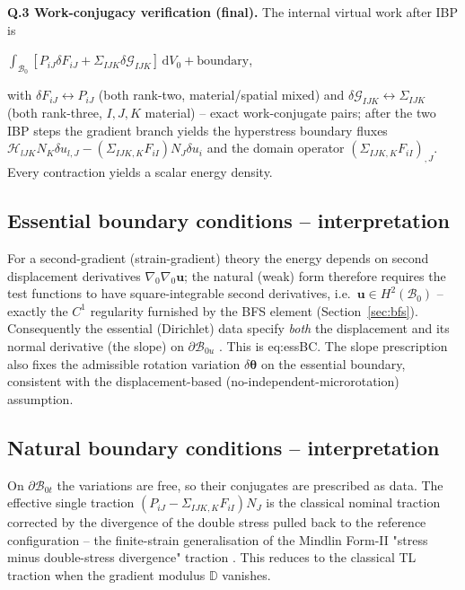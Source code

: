 \documentclass[11pt]{article}
\begin{document}
\textbf{Q.3 Work-conjugacy verification (final).} The internal virtual work after IBP is

$\int_{\mathcal{B}_0}[P_{iJ}\delta F_{iJ}+\Sigma_{IJK}\delta\mathcal{G}_{IJK}]\,\mathrm{d}V_0+\text{boundary}$,

with $\delta F_{iJ}\leftrightarrow P_{iJ}$ (both rank-two, material/spatial mixed) and $\delta\mathcal{G}_{IJK}\leftrightarrow\Sigma_{IJK}$ (both rank-three, $I,J,K$ material) -- exact work-conjugate pairs; after the two IBP steps the gradient branch yields the hyperstress boundary fluxes $\mathcal{H}_{lJK}N_K\delta u_{l,J}-(\Sigma_{IJK,K}F_{iI})N_J\delta u_i$ and the domain operator $(\Sigma_{IJK,K}F_{iI})_{,J}$. Every contraction yields a scalar energy density. \checkmark

\subsection{Essential boundary conditions -- interpretation}
\label{subsec:essentialnotes}

For a second-gradient (strain-gradient) theory the energy depends on second displacement derivatives $\nabla_0\nabla_0\mathbf{u}$; the natural (weak) form therefore requires the test functions to have square-integrable second derivatives, i.e.\ $\mathbf{u}\in H^2(\mathcal{B}_0)$ -- exactly the $C^1$ regularity furnished by the BFS element (Section~\ref{sec:bfs}). Consequently the essential (Dirichlet) data specify \emph{both} the displacement and its normal derivative (the slope) on $\partial\mathcal{B}_{0u}$ \cite{AmanatidouAravas2002,EngelGarikipati2002,Toupin1964}. This is eq:essBC. The slope prescription also fixes the admissible rotation variation $\delta\boldsymbol{\theta}$ on the essential boundary, consistent with the displacement-based (no-independent-microrotation) assumption. \checkmark

\subsection{Natural boundary conditions -- interpretation}
\label{subsec:naturalnotes}

On $\partial\mathcal{B}_{0t}$ the variations are free, so their conjugates are prescribed as data. The effective single traction $(P_{iJ}-\Sigma_{IJK,K}F_{iI})N_J$ is the classical nominal traction corrected by the divergence of the double stress pulled back to the reference configuration -- the finite-strain generalisation of the Mindlin Form-II "stress minus double-stress divergence" traction \cite{Mindlin1964,MindlinEshel1968,Toupin1964}. This reduces to the classical TL traction when the gradient modulus $\mathbb{D}$ vanishes. \checkmark
\end{document}

